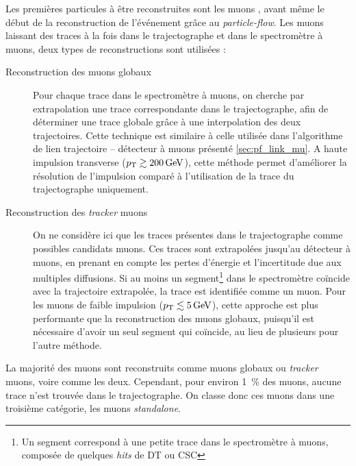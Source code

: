 Les premières particules à être reconstruites sont les muons \citep{cms_muons_reco}, avant même le début de la reconstruction de l'événement grâce au \emph{particle-flow}. Les muons laissant des traces à la fois dans le trajectographe et dans le spectromètre à muons, deux types de reconstructions sont utilisées :

\begin{description}
    \item[Reconstruction des muons globaux] Pour chaque trace dans le spectromètre à muons, on cherche par extrapolation une trace correspondante dans le trajectographe, afin de déterminer une trace globale grâce à une interpolation des deux trajectoires. Cette technique est similaire à celle utilisée dans l'algorithme de lien trajectoire -- détecteur à muons présenté \cref{sec:pf_link_mu}. A haute impulsion transverse ($\pt \gtrsim \SI{200}{\GeV}$), cette méthode permet d'améliorer la résolution de l'impulsion comparé à l'utilisation de la trace du trajectographe uniquement.
    \item[Reconstruction des \emph{tracker} muons] On ne considère ici que les traces présentes dans le trajectographe comme possibles candidats muons. Ces traces sont extrapolées jusqu'au détecteur à muons, en prenant en compte les pertes d'énergie et l'incertitude due aux multiples diffusions. Si au moins un segment\footnote{Un segment correspond à une petite trace dans le spectromètre à muons, composée de quelques \emph{hits} de DT ou CSC} dans le spectromètre coïncide avec la trajectoire extrapolée, la trace est identifiée comme un muon. Pour les muons de faible impulsion ($\pt \lesssim
 \SI{5}{\GeV}$), cette approche est plus performante que la reconstruction des muons globaux, puisqu'il est nécessaire d'avoir un seul segment qui coïncide, au lieu de plusieurs pour l'autre méthode.
\end{description}

La majorité des muons sont reconstruits comme muons globaux ou \emph{tracker} muons, voire comme les deux. Cependant, pour environ \SI{1}{\%} des muons, aucune trace n'est trouvée dans le trajectographe. On classe donc ces muons dans une troisième catégorie, les muons \emph{standalone}.

\medskip

